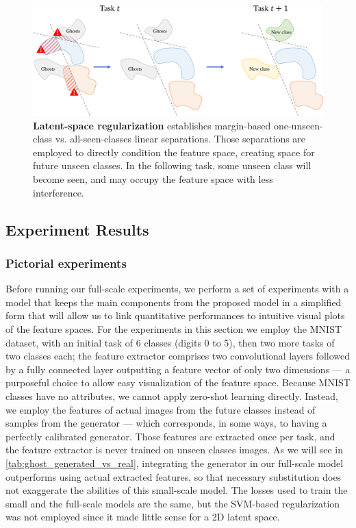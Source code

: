 \begin{figure}
    \centering
    \includegraphics[width=0.7\linewidth]{images/ghost/svm_reg.pdf}
    \caption{\textbf{Latent-space regularization} establishes margin-based one-unseen-class vs.
        all-seen-classes linear separations. Those separations are employed to directly condition the
        feature space, creating space for future unseen classes. In the following task, some unseen
        class will become seen, and may occupy the feature space with less interference.}
    \label{fig:ghost_svm_reg}
\end{figure}

\subsection{Experiment Results}
\label{sec:ghost_exp}

\subsubsection{Pictorial experiments}
\label{sec:ghost_pictorial}

Before running our full-scale experiments, we perform a set of experiments with a model that keeps
the main components from the proposed model in a simplified form that will allow us to link
quantitative performances to intuitive visual plots of the feature spaces. For the experiments in
this section we employ the MNIST \citep{lecun2010mnist} dataset, with an initial task of 6 classes
(digits 0 to 5), then two more tasks of two classes each; the feature extractor comprises two
convolutional layers followed by a fully connected layer outputting a feature vector of only two
dimensions — a purposeful choice to allow easy visualization of the feature space. Because MNIST
classes have no attributes, we cannot apply zero-shot learning directly. Instead, we employ the
features of actual images from the future classes instead of samples from the generator — which
corresponds, in some ways, to having a perfectly calibrated generator. Those features are extracted
once per task, and the feature extractor is never trained on unseen classes images. As we will see
in \autoref{tab:ghost_generated_vs_real}, integrating the generator in our full-scale model
outperforms using actual extracted features, so that necessary substitution does not exaggerate the
abilities of this small-scale model. The losses used to train the small and the full-scale models
are the same, but the SVM-based regularization was not employed since it made little sense for a 2D
latent space.

